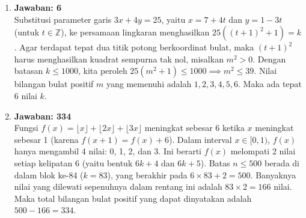 \documentclass[12pt]{scrartcl}
\begin{document}
\begin{enumerate}
\item \textbf{Jawaban: 6} \\
Substitusi parameter garis $3x+4y=25$, yaitu $x = 7+4t$ dan $y = 1-3t$ (untuk $t \in \mathbb{Z}$), ke persamaan lingkaran menghasilkan $25((t+1)^2 + 1) = k$. 
Agar terdapat tepat dua titik potong berkoordinat bulat, maka $(t+1)^2$ harus menghasilkan kuadrat sempurna tak nol, misalkan $m^2 > 0$. Dengan batasan $k \le 1000$, kita peroleh $25(m^2+1) \le 1000 \implies m^2 \le 39$. Nilai bilangan bulat positif $m$ yang memenuhi adalah $1, 2, 3, 4, 5, 6$. Maka ada tepat 6 nilai $k$.

\item \textbf{Jawaban: 334} \\
Fungsi $f(x) = \lfloor x \rfloor + \lfloor 2x \rfloor + \lfloor 3x \rfloor$ meningkat sebesar 6 ketika $x$ meningkat sebesar 1 (karena $f(x+1) = f(x) + 6$). Dalam interval $x \in [0, 1)$, $f(x)$ hanya mengambil 4 nilai: 0, 1, 2, dan 3. Ini berarti $f(x)$ melompati 2 nilai setiap kelipatan 6 (yaitu bentuk $6k+4$ dan $6k+5$). 
Batas $n \le 500$ berada di dalam blok ke-84 ($k=83$), yang berakhir pada $6 \times 83 + 2 = 500$. Banyaknya nilai yang dilewati sepenuhnya dalam rentang ini adalah $83 \times 2 = 166$ nilai. Maka total bilangan bulat positif yang dapat dinyatakan adalah $500 - 166 = 334$.

\end{enumerate}
\end{document}
